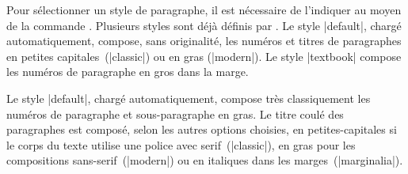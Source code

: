 
Pour sélectionner un style de paragraphe, il est nécessaire de l'indiquer au moyen de la commande . Plusieurs styles sont déjà définis par \frenchlaw. Le style |default|, chargé automatiquement, compose, sans originalité, les numéros et titres de paragraphes en petites capitales~(|classic|) ou en gras (|modern|). Le style |textbook| compose les numéros de paragraphe en gros dans la marge.

\begin{macro}
\end{macro}


Le style |default|, chargé automatiquement, compose très classiquement les numéros de paragraphe et sous-paragraphe en gras. Le titre coulé des paragraphes est composé, selon les autres options choisies, en petites-capitales si le corps du texte utilise une police avec serif~(|classic|), en gras pour les compositions sans-serif~(|modern|) ou en italiques dans les marges~(|marginalia|).

\begin{noprint}
\end{noprint}

